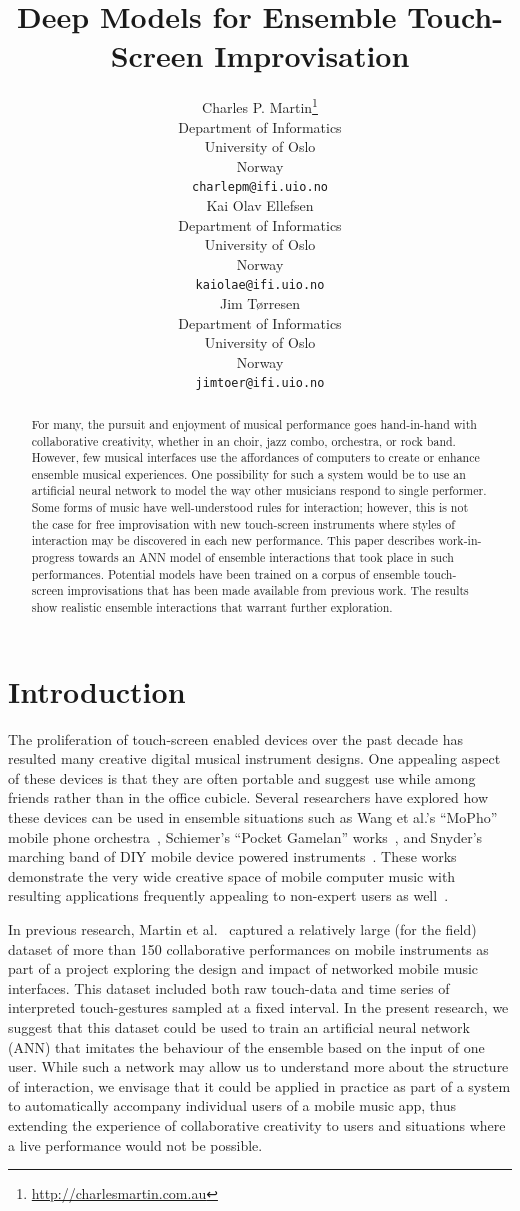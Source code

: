 \documentclass{article}
\title{Deep Models for Ensemble Touch-Screen Improvisation}
\author{
  Charles P. Martin\thanks{\url{http://charlesmartin.com.au}}\\
  Department of Informatics\\
  University of Oslo\\
  Norway\\
  \texttt{charlepm@ifi.uio.no}\\
  \And
  Kai Olav Ellefsen \\
  Department of Informatics\\
  University of Oslo\\
  Norway\\
  \texttt{kaiolae@ifi.uio.no}\\
  \And
  Jim T{\o}rresen\\
  Department of Informatics\\
  University of Oslo\\
  Norway\\
  \texttt{jimtoer@ifi.uio.no}\\
}
\begin{document}
\maketitle

\begin{abstract}
  For many, the pursuit and enjoyment of musical performance goes
  hand-in-hand with collaborative creativity, whether in an choir,
  jazz combo, orchestra, or rock band. However, few musical interfaces
  use the affordances of computers to create or enhance ensemble
  musical experiences. One possibility for such a system would be to
  use an artificial neural network to model the way other musicians
  respond to single performer. Some forms of music have
  well-understood rules for interaction; however, this is not the case
  for free improvisation with new touch-screen instruments where
  styles of interaction may be discovered in each new performance.
  This paper describes work-in-progress towards an ANN model of
  ensemble interactions that took place in such performances.
  Potential models have been trained on a corpus of ensemble
  touch-screen improvisations that has been made available from
  previous work. The results show realistic ensemble interactions that
  warrant further exploration.
\end{abstract}

\section{Introduction}

The proliferation of touch-screen enabled devices over the past decade
has resulted many creative digital musical instrument designs. One
appealing aspect of these devices is that they are often portable and
suggest use while among friends rather than in the office cubicle.
Several researchers have explored how these devices can be used in
ensemble situations such as Wang et al.'s ``MoPho'' mobile phone
orchestra~\cite{Wang:2014cs}, Schiemer's ``Pocket Gamelan''
works~\cite{Greg-Schiemer:2007mz}, and Snyder's marching band of DIY
mobile device powered instruments~\cite{Snyder:2014dp}. These works
demonstrate the very wide creative space of mobile computer music with
resulting applications frequently appealing to non-expert users as
well~\cite{Wang:2014ul, Hamilton:2011aa}.

In previous research, Martin et al.~\cite{Martin:2016rm} captured a
relatively large (for the field) dataset of more than 150
collaborative performances on mobile instruments as part of a project
exploring the design and impact of networked mobile music interfaces.
This dataset included both raw touch-data and time series of
interpreted touch-gestures sampled at a fixed interval. In the present
research, we suggest that this dataset could be used to train an
artificial neural network (ANN) that imitates the behaviour of the
ensemble based on the input of one user. While such a network may
allow us to understand more about the structure of interaction, we
envisage that it could be applied in practice as part of a system to
automatically accompany individual users of a mobile music app, thus
extending the experience of collaborative creativity to users and
situations where a live performance would not be possible.
\end{document}
